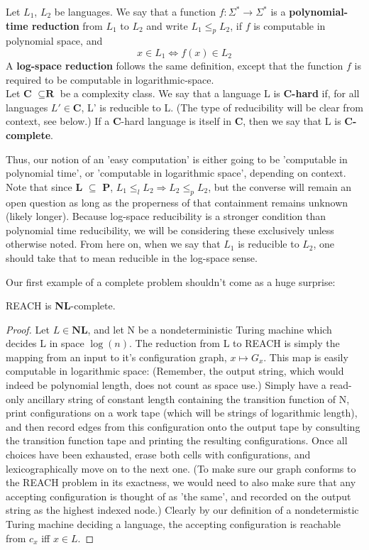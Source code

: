 \begin{definition}
Let $L_1$, $L_2$ be languages. We say that a function $f:\Sigma^* \to \Sigma^*$ is a \textbf{polynomial-time reduction} from $L_1$ to $L_2$ and write $L_1 \leq_p L_2$, if $f$ is computable in polynomial space, and 
\[x \in L_1 \iff f(x) \in L_2 \]
A \textbf{log-space reduction} follows the same definition, except that the function $f$ is required to be computable in logarithmic-space. \\
Let \textbf{C} $\subseteq \textbf{R}$ be a complexity class. We say that a language L is \textbf{C-hard} if, for all languages $L' \in \textbf{C}$, L' is reducible to L. (The type of reducibility will be clear from context, see below.) If a \textbf{C}-hard language is itself in \textbf{C}, then we say that L is \textbf{C-complete}.
\end{definition}
Thus, our notion of an 'easy computation' is either going to be 'computable in polynomial time', or 'computable in logarithmic space', depending on context. Note that since \textbf{L} $\subseteq$ \textbf{P}, $L_1 \leq_l L_2 \Rightarrow L_2 \leq_p L_2$, but the converse will remain an open question as long as the properness of that containment remains unknown (likely longer). Because log-space reducibility is a stronger condition than polynomial time reducibility, we will be considering these exclusively unless otherwise noted. From here on, when we say that $L_1$ is reducible to $L_2$, one should take that to mean reducible in the log-space sense.
\par Our first example of a complete problem shouldn't come as a huge surprise:
\begin{theorem}
REACH is \textbf{NL}-complete.
\end{theorem}
\begin{proof}
Let $L \in \textbf{NL}$, and let N be a nondeterministic Turing machine which decides L in space $\log(n)$. The reduction from L to REACH is simply the mapping from an input to it's configuration graph, $x \mapsto G_x$. This map is easily computable in logarithmic space: (Remember, the output string, which would indeed be polynomial length, does not count as space use.) Simply have a read-only ancillary string of constant length containing the transition function of N, print configurations on a work tape (which will be strings of logarithmic length), and then record edges from this configuration onto the output tape by consulting the transition function tape and printing the resulting configurations. Once all choices have been exhausted, erase both cells with configurations, and lexicographically move on to the next one. (To make sure our graph conforms to the REACH problem in its exactness, we would need to also make sure that any accepting configuration is thought of as 'the same', and recorded on the output string as the highest indexed node.) Clearly by our definition of a nondetermistic Turing machine deciding a language, the accepting configuration is reachable from $c_x$ iff $x \in L$.
\end{proof}
